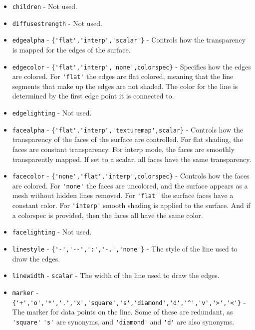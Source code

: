 \begin{itemize}
\item  \verb|children| - Not used.

\item  \verb|diffusestrength| - Not used.

\item  \verb|edgealpha| - \verb|{'flat','interp','scalar'}| - Controls how the
 transparency is mapped for the edges of the surface.

\item  \verb|edgecolor| - \verb|{'flat','interp','none',colorspec}| - Specifies
 how the edges are colored.  For \verb|'flat'| the edges are flat colored,
 meaning that the line segments that make up the edges are not shaded.
 The color for the line is determined by the first edge point it is connected
 to.

\item  \verb|edgelighting| - Not used.

\item  \verb|facealpha| - \verb|{'flat','interp','texturemap',scalar}| - Controls
 how the transparency of the faces of the surface are controlled.  For
 flat shading, the faces are constant transparency.  For interp mode, the faces
 are smoothly transparently mapped.  If set to a scalar, all faces have the
 same transparency.

\item  \verb|facecolor| - \verb|{'none','flat','interp',colorspec}| - Controls
 how the faces are colored.  For \verb|'none'| the faces are uncolored, and
 the surface appears as a mesh without hidden lines removed.  For \verb|'flat'|
 the surface faces have a constant color.  For \verb|'interp'| smooth shading
 is applied to the surface.  And if a colorspec is provided, then the
 faces all have the same color.

\item  \verb|facelighting| - Not used.

\item  \verb|linestyle| - \verb|{'-','--',':','-.','none'}| - The style of the line used
 to draw the edges.

\item  \verb|linewidth| - \verb|scalar| - The width of the line used to draw the edges.

\item  \verb|marker| - \verb|{'+','o','*','.','x','square','s','diamond','d','^','v','>','<'}| - 
 The marker for data points on the line.  Some of these are redundant, as \verb|'square'| 
 \verb|'s'| are synonyms, and \verb|'diamond'| and \verb|'d'| are also synonyms.


\end{itemize}
